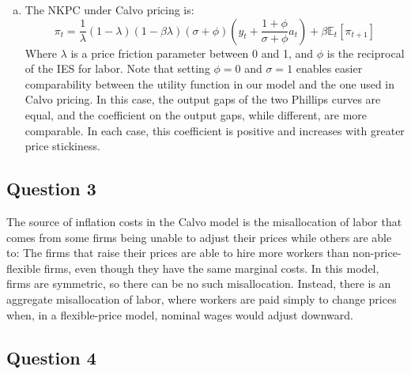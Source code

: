 \documentclass{article}
\newcommand{\Et}[1]{\mathbb{E}_t\left[#1\right]}
\begin{document}
\begin{enumerate}[(a)]
	\item The NKPC under Calvo pricing is:
		\[
			\pi_t = \frac{1}{\lambda}(1-\lambda)(1-\beta\lambda)(\sigma + \phi)\left(y_t + \frac{1+\phi}{\sigma+\phi}a_t\right) + \beta\Et{\pi_{t+1}}
		\]
		Where $\lambda$ is a price friction parameter between 0 and 1, and $\phi$ is the reciprocal of the IES for labor. Note that setting ${\phi=0}$ and ${\sigma=1}$ enables easier comparability between the utility function in our model and the one used in Calvo pricing. In this case, the output gaps of the two Phillips curves are equal, and the coefficient on the output gaps, while different, are more comparable. In each case, this coefficient is positive and increases with greater price stickiness.
	
\end{enumerate}




\subsection*{Question 3}

The source of inflation costs in the Calvo model is the misallocation of labor that comes from some firms being unable to adjust their prices while others are able to: The firms that raise their prices are able to hire more workers than non-price-flexible firms, even though they have the same marginal costs. In this model, firms are symmetric, so there can be no such misallocation. Instead, there is an aggregate misallocation of labor, where workers are paid simply to change prices when, in a flexible-price model, nominal wages would adjust downward.



\subsection*{Question 4}
\end{document}
